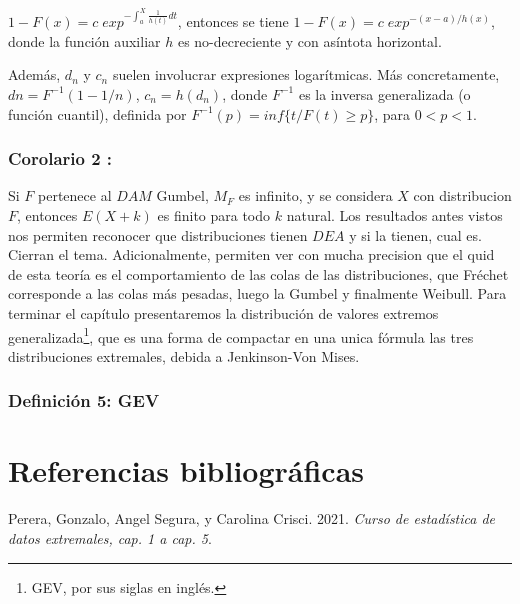 \documentclass[
  12pt]{article}
\newlength{\cslhangindent}
\newlength{\cslentryspacingunit} %
\newenvironment{CSLReferences}[2] %
 {%
  \setlength{\parindent}{0pt}
  \ifodd #1
  \let\oldpar\par
  \def\par{\hangindent=\cslhangindent\oldpar}
  \fi
  \setlength{\parskip}{#2\cslentryspacingunit}
 }%
 {}
\begin{document}
\(1-F(x)= c\;exp^{{- \int_a^X \frac{1}{h(t)} dt}}\), entonces se tiene
\(1-F(x)= c\;exp^{-(x-a)/h(x)}\), donde la función auxiliar \(h\) es
no-decreciente y con asíntota horizontal.

Además, \(d_n\) y \(c_n\) suelen involucrar expresiones logarítmicas.
Más concretamente, \(dn = F^{-1}(1-1/n)\), \(c_n = h(d_n)\), donde
\(F^{-1}\) es la inversa generalizada (o función cuantil), definida por
\(F^{-1}(p)= inf\{t / F(t)\geq p\}\), para \(0<p<1\).

\hypertarget{corolario-2}{%
\subsubsection{Corolario 2 :}\label{corolario-2}}

Si \(F\) pertenece al \(DAM\) Gumbel, \(M_F\) es infinito, y se
considera \(X\) con distribucion \(F\), entonces \(E(X+k)\) es finito
para todo \(k\) natural. Los resultados antes vistos nos permiten
reconocer que distribuciones tienen \(DEA\) y si la tienen, cual es.
Cierran el tema. Adicionalmente, permiten ver con mucha precision que el
quid de esta teoría es el comportamiento de las colas de las
distribuciones, que Fréchet corresponde a las colas más pesadas, luego
la Gumbel y finalmente Weibull. Para terminar el capítulo presentaremos
la distribución de valores extremos
generalizada\footnote{GEV, por sus siglas en inglés.}, que es una forma
de compactar en una unica fórmula las tres distribuciones extremales,
debida a Jenkinson-Von Mises.

\hypertarget{definiciuxf3n-5-gev}{%
\subsubsection{Definición 5: GEV}\label{definiciuxf3n-5-gev}}

\newpage

\hypertarget{referencias-bibliogruxe1ficas}{%
\section{Referencias
bibliográficas}\label{referencias-bibliogruxe1ficas}}

\vspace{1cm}
\setlength{\parindent}{-0.2in}
\setlength{\leftskip}{0.2in}

\hypertarget{refs}{}
\begin{CSLReferences}{1}{0}
\leavevmode{}%
Perera, Gonzalo, Angel Segura, y Carolina Crisci. 2021. \emph{Curso de
estadística de datos extremales, cap. 1 a cap. 5}.

\end{CSLReferences}
\end{document}
